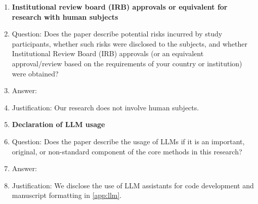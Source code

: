 \begin{enumerate}
\item {\bf Institutional review board (IRB) approvals or equivalent for research with human subjects}
    \item[] Question: Does the paper describe potential risks incurred by study participants, whether such risks were disclosed to the subjects, and whether Institutional Review Board (IRB) approvals (or an equivalent approval/review based on the requirements of your country or institution) were obtained?
    \item[] Answer: \answerNA{}
    \item[] Justification: Our research does not involve human subjects.

\item {\bf Declaration of LLM usage}
    \item[] Question: Does the paper describe the usage of LLMs if it is an important, original, or non-standard component of the core methods in this research?
    \item[] Answer: \answerYes{}
    \item[] Justification: We disclose the use of LLM assistants for code development and manuscript formatting in \cref{app:llm}.

\end{enumerate}
